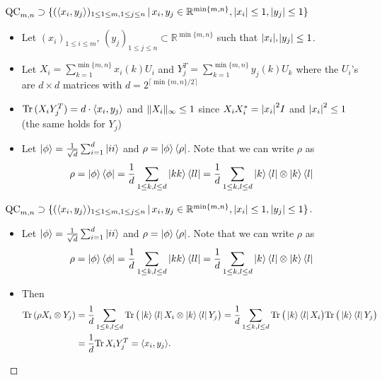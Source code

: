 \begin{frame}
	\begin{block}{$ \textup{QC}_{m,n} \supset \{ (\langle x_i,y_j \rangle)_{1 \le 1 \le m, 1 \le j \le n} \,| \, x_i,y_j \in \mathbb{R}^{ \min \{m,n \} }, \vert x_i  \vert \le 1, \vert y_j \vert \le 1  \} $}
		\begin{itemize}
			\item<1->  Let $ (x_i)_{1 \le i \le m}, \, (y_j)_{1 \le j \le n} \subset \mathbb{R}^{\min \{ m,n \}}$ such that $ {\left|{x_i}\right|},$$ {\left|{y_j}\right|} \le 1 $. 
			\item<2->  Let $ X_i = \sum_{k=1}^{\min \{m,n\}} x_i(k)U_i $ and $ Y_j^{T } = \sum_{k=1}^{\min \{m,n\}}y_j(k)U_k $ where the $ U_i $'s are $ d \times d $ matrices with $  d = 2^{\lceil \min \{m,n\}/2 \rceil} $
			\item<3-> $ \text{Tr} \, {(X_iY_j^T)}  = d\cdot \langle x_i, y_j \rangle  $ and $  \Vert {X_i} \Vert_{\infty} \le 1 $ since $ X_iX_i^* = {\left|{x_i}\right|}^2I $ and $ {\left|{x_i}\right|}^2 \le 1  $ (the same holds for $ Y_j $)
			\item<4-> Let $ \ket{\phi} = \frac{1}{\sqrt{d}}\sum_{i= 1}^{d}\ket{ii} $ and $ \rho = \ket{\phi}\bra{\rho} $. Note that we can write $ \rho $ as
			\begin{align*}
			\rho = \ket{\phi}\bra{\phi} = \frac{1}{d}\sum_{1 \le k,l \le d}\ket{kk}\bra{ll} = \frac{1}{d} \sum_{1 \le k,l \le d}\ket{k}\bra{l} \otimes \ket{k}\bra{l}
			\end{align*}
		\end{itemize}
	\end{block}
\end{frame}

\begin{frame}
	\begin{proof}[$ \textup{QC}_{m,n} \supset \{ (\langle x_i,y_j \rangle)_{1 \le 1 \le m, 1 \le j \le n} \,| \, x_i,y_j \in \mathbb{R}^{ \min \{m,n \} }, \vert x_i  \vert \le 1, \vert y_j \vert \le 1  \} $]
		\begin{itemize}
			\item<1->{\footnotesize Let $ \ket{\phi} = \frac{1}{\sqrt{d}}\sum_{i= 1}^{d}\ket{ii} $ and $ \rho = \ket{\phi}\bra{\rho} $. Note that we can write $ \rho $ as
			\begin{align*}
			\rho = \ket{\phi}\bra{\phi} = \frac{1}{d}\sum_{1 \le k,l \le d}\ket{kk}\bra{ll} = \frac{1}{d} \sum_{1 \le k,l \le d}\ket{k}\bra{l} \otimes \ket{k}\bra{l}
			\end{align*}}
			\item<2-> Then 
			\begin{align*}
			\text{Tr} \, {(\rho X_i \otimes Y_j)}  &=\frac{1}{d} \sum_{1 \le k,l \le d} \text{Tr} \, { \big (\ket{k}\bra{l}X_i \otimes \ket{k}\bra{l}Y_j \big )}  = \frac{1}{d} \sum_{1 \le k,l \le d} \text{Tr} \, {\big (\ket{k}\bra{l}X_i \big )}  \text{Tr} \, {\big (\ket{k}\bra{l}Y_j \big )}  \\
			&=  \frac{1}{d} \text{Tr} \, {X_iY_j^T}  = \langle x_i,y_j \rangle.
			\end{align*}
		\end{itemize}
	\end{proof}
\end{frame}


